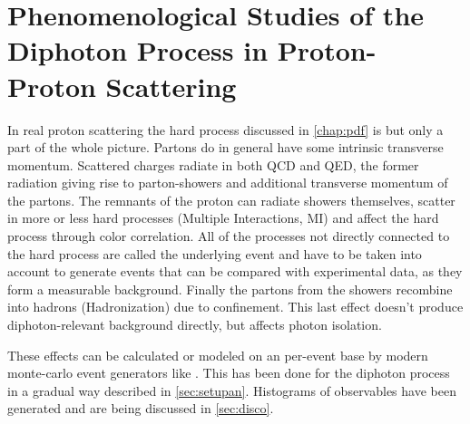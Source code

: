 \chapter{Phenomenological Studies of the Diphoton Process in Proton-Proton
  Scattering}%
\label{chap:pheno}

In real proton scattering the hard process discussed in
\cref{chap:pdf} is but only a part of the whole picture. Partons do in
general have some intrinsic transverse momentum.  Scattered charges
radiate in both QCD and QED, the former radiation giving rise to
parton-showers and additional transverse momentum of the partons. The
remnants of the proton can radiate showers themselves, scatter in more
or less hard processes (Multiple Interactions, MI) and affect the hard
process through color correlation. All of the processes not directly
connected to the hard process are called the underlying event and have
to be taken into account to generate events that can be compared with
experimental data, as they form a measurable background. Finally the
partons from the showers recombine into hadrons (Hadronization) due to
confinement. This last effect doesn't produce diphoton-relevant
background directly, but affects photon
isolation.~\cite[11]{buckley:2011ge} %

These effects can be calculated or modeled on an per-event base by
modern monte-carlo event generators like \sherpa. This has been done
for the diphoton process in a gradual way described in
\cref{sec:setupan}. Histograms of observables have been generated and
are being discussed in \cref{sec:disco}.


